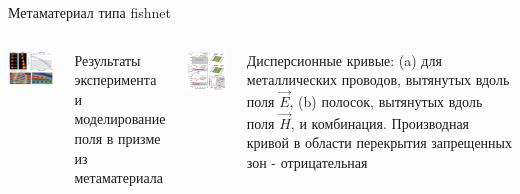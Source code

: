 \documentclass[9pt, compress, xcolor=table]{beamer}
\begin{document}
\begin{frame}{Метаматериал типа fishnet}

\begin{columns}[c]
\column{6cm}
\begin{center}
\includegraphics[width=6cm]{neg_ref_26}
\end{center}
{\tiny Результаты эксперимента и моделирование поля в призме из метаматериала}

\column{6cm}
\begin{center}
\includegraphics[width=5cm]{neg_ref_26a}
\end{center}

{\tiny Дисперсионные кривые: (a) для металлических проводов, вытянутых вдоль поля $\vec E$, (b)
полосок, вытянутых вдоль поля $\vec H$, и комбинация. Производная кривой в области перекрытия
запрещенных зон - отрицательная}
\end{columns}

\end{frame}
\end{document}
